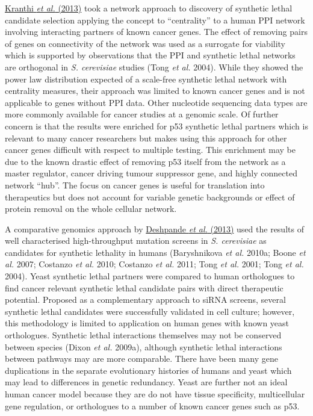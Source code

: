 \hyperlink{ENREF59}{Kranthi}\hyperlink{ENREF59}{\textit{ et al.}}\hyperlink{ENREF59}{ (2013)} took a network approach to discovery of synthetic lethal candidate selection applying the concept to ``centrality'' to a human PPI network involving interacting partners of known cancer genes. The effect of removing pairs of genes on connectivity of the network was used as a surrogate for viability which is supported by observations that the PPI and synthetic lethal networks are orthogonal in \textit{S. cerevisiae} studies (Tong\textit{ et al.} 2004). While they showed the power law distribution expected of a scale-free synthetic lethal network with centrality measures, their approach was limited to known cancer genes and is not applicable to genes without PPI data. Other nucleotide sequencing data types are more commonly available for cancer studies at a genomic scale. Of further concern is that the results were enriched for p53 synthetic lethal partners which is relevant to many cancer researchers but makes using this approach for other cancer genes difficult with respect to multiple testing. This enrichment may be due to the known drastic effect of removing p53 itself from the network as a master regulator, cancer driving tumour suppressor gene, and highly connected network ``hub''. The focus on cancer genes is useful for translation into therapeutics but does not account for variable genetic backgrounds or effect of protein removal on the whole cellular network.  

A comparative genomics approach by \hyperlink{ENREF30}{Deshpande}\hyperlink{ENREF30}{\textit{ et al.}}\hyperlink{ENREF30}{ (2013)} used the results of well characterised high-throughput mutation screens in \textit{S. cerevisiae }as candidates for synthetic lethality in humans (Baryshnikova\textit{ et al.} 2010a; Boone\textit{ et al.} 2007; Costanzo\textit{ et al.} 2010; Costanzo\textit{ et al.} 2011; Tong\textit{ et al.} 2001; Tong\textit{ et al.} 2004). Yeast synthetic lethal partners were compared to human orthologues to find cancer relevant synthetic lethal candidate pairs with direct therapeutic potential. Proposed as a complementary approach to siRNA screens, several synthetic lethal candidates were successfully validated in cell culture; however, this methodology is limited to application on human genes with known yeast orthologues. Synthetic lethal interactions themselves may not be conserved between species (Dixon\textit{ et al.} 2009a), although synthetic lethal interactions between pathways may are more comparable. There have been many gene duplications in the separate evolutionary histories of humans and yeast which may lead to differences in genetic redundancy. Yeast are further not an ideal human cancer model because they are do not have tissue specificity, multicellular gene regulation, or orthologues to a number of known cancer genes such as p53.  

